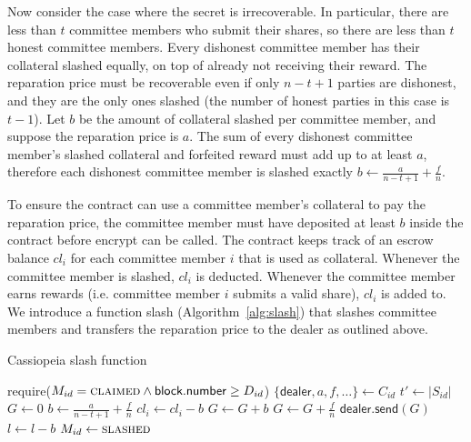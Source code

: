 Now consider the case where the secret is irrecoverable.
In particular, there are less than $t$ committee members who submit their shares, so there are less than $t$ honest committee members.
Every dishonest committee member has their collateral slashed equally, on top of already not receiving their reward.
The reparation price must be recoverable even if only $n - t + 1$ parties are dishonest, and they are the only ones slashed (the number of honest parties in this case is $t - 1$).
Let $b$ be the amount of collateral slashed per committee member, and suppose the reparation price is $a$.
The sum of every dishonest committee member's slashed collateral and forfeited reward must add up to at least $a$, therefore each dishonest committee member is slashed exactly $b \gets \frac{a}{n - t + 1} + \frac{f}{n}$.

To ensure the contract can use a committee member's collateral to pay the reparation price, the committee member must have deposited at least $b$ inside the contract before \textsf{encrypt} can be called.
The contract keeps track of an escrow balance $cl_i$ for each committee member $i$ that is used as collateral.
Whenever the committee member is slashed, $cl_i$ is deducted.
Whenever the committee member earns rewards (i.e. committee member $i$ submits a valid share), $cl_i$ is added to.
We introduce a function \textsf{slash} (Algorithm~\ref{alg:slash}) that slashes committee members and transfers the reparation price to the dealer as outlined above.

\begin{algorithm}[h]
\caption{Cassiopeia \textsf{slash} function}
\label{alg:slash}
    \begin{algorithmic}[1]
                \State require($M_{id} = \textsc{claimed} \land \textsf{block.number} \geq D_{id}$)
                \State $\{\textsf{dealer}, a, f, \dots\} \gets C_{id}$
                \State $t' \gets |S_{id}|$
                \State $G \gets 0$
                \State $b \gets \frac{a}{n - t + 1} + \frac{f}{n}$ 
                            \State $cl_i \gets cl_i - b$
                            \State $G \gets G + b$
                        \EndIf
                        \State $G \gets G + \frac{f}{n}$
                    \EndIf
                \EndFor
                \State $\textsf{dealer.send}(G)$
                \State $l \gets l - b$ 
                \State $M_{id} \gets \textsc{slashed}$
            \EndFunction
    \end{algorithmic}
\end{algorithm}

